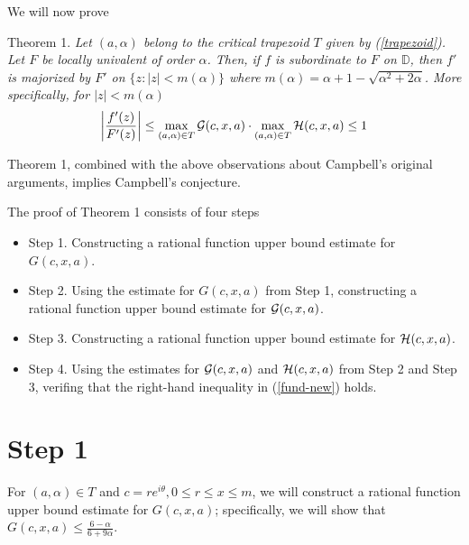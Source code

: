 \documentclass[12pt]{article}
\newcommand{\D}{{\mathbb D}}
\newcommand{\ds}{\displaystyle}
\begin{document}
\vspace{0.05in}

\noindent We will now prove 

\vspace{0.05in}

Theorem 1. \emph{ Let $(a,\alpha)$ belong to the critical trapezoid $T$ given by (\ref{trapezoid}). Let $F$ be locally univalent of order $\alpha$.  Then, if $f$ is subordinate to $F$ on 
$\D$, then $f'$ is majorized by $F'$ on $\{ z : |z| < m(\alpha) \}$ where 
$m(\alpha) = \alpha +1 - \sqrt{\alpha^2+2\alpha}$.  More specifically, for $|z| < m(\alpha)$
\begin{equation} \label{fund-new}
\left | \frac{f'(z)}{F'(z)}\right | \le  \max_{(a,\alpha)\in T}{\cal G}(c,x,a) \cdot \max_{(a,\alpha)\in T}{\cal H}(c,x,a) \le 1
\end{equation} } 

\noindent Theorem 1, combined with the above observations about Campbell's original arguments, implies Campbell's conjecture.  

\newpage

The proof of Theorem 1 consists of four steps

\begin{itemize}
	\item Step 1.  Constructing a rational function upper bound estimate  for ${\ds G(c,x,a)}$.
	\item Step 2.  Using the estimate for ${\ds G(c,x,a)}$ from Step 1, constructing a rational function upper bound estimate  for ${\ds {\cal G}(c,x,a)}$.
	\item Step 3.  Constructing a rational function upper bound estimate  for ${\ds {\cal H}(c,x,a)}$.
	\item Step 4.  Using the estimates for ${\ds {\cal G}(c,x,a)}$ and ${\ds {\cal H}(c,x,a)}$ from Step 2 and Step 3, verifing that the right-hand inequality in (\ref{fund-new}) holds.
\end{itemize}


\section{Step 1}

For $(a,\alpha) \in T$ and $c = re^{i\theta}, 0 \le r \le x \le m$, we will construct a rational function upper bound estimate for ${\ds G(c,x,a)}$; specifically, we will show that ${\ds G(c,x,a) \le \frac{6-\alpha}{6+9\alpha}}$. 
\end{document}
